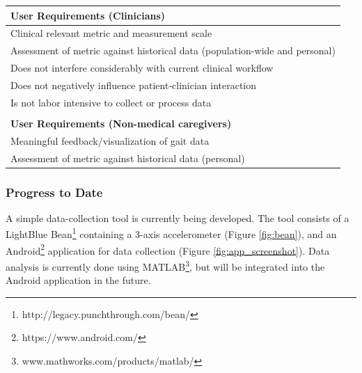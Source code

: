 \documentclass[11pt, oneside]{report}
\begin{document}
\begin{table}[!h]
\begin{tabular}{p{\textwidth}}
	\textbf{User Requirements (Clinicians)}  \\ \hline 
	Clinical relevant metric and measurement scale \\ \hline 
	Assessment of metric against historical data (population-wide and personal) \\ \hline 
	Does not interfere considerably with current clinical workflow \\ \hline 
	Does not negatively influence patient-clinician interaction \\ \hline 
	Is not labor intensive to collect or process data \\ \\
	
	\textbf{User Requirements (Non-medical caregivers)} \\ \hline
	Meaningful feedback/visualization of gait data \\ \hline 
	Assessment of metric against historical data (personal) \\ \hline 
	
  \end{tabular}
\end{table}

\subsubsection{Progress to Date}

A simple data-collection tool is currently being developed. The tool consists of a LightBlue Bean\footnote{http://legacy.punchthrough.com/bean/} containing a 3-axis accelerometer (Figure \ref{fig:bean}), and an Android\footnote{https://www.android.com/} application for data collection (Figure \ref{fig:app_screenshot}). Data analysis is currently done using MATLAB\footnote{www.mathworks.com/products/matlab/}, but will be integrated into the Android application in the future. \\
\end{document}
